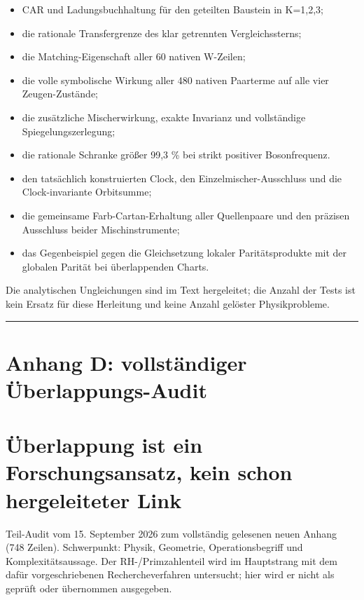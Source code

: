 \begin{itemize}
\tightlist
\item
  CAR und Ladungsbuchhaltung für den geteilten Baustein in K=1,2,3;
\item
  die rationale Transfergrenze des klar getrennten Vergleichssterns;
\item
  die Matching-Eigenschaft aller 60 nativen W-Zeilen;
\item
  die volle symbolische Wirkung aller 480 nativen Paarterme auf alle
  vier Zeugen-Zustände;
\item
  die zusätzliche Mischerwirkung, exakte Invarianz und vollständige
  Spiegelungszerlegung;
\item
  die rationale Schranke größer 99,3 \% bei strikt positiver
  Bosonfrequenz.
\item
  den tatsächlich konstruierten Clock, den Einzelmischer-Ausschluss und
  die Clock-invariante Orbitsumme;
\item
  die gemeinsame Farb-Cartan-Erhaltung aller Quellenpaare und den
  präzisen Ausschluss beider Mischinstrumente;
\item
  das Gegenbeispiel gegen die Gleichsetzung lokaler Paritätsprodukte mit
  der globalen Parität bei überlappenden Charts.
\end{itemize}

Die analytischen Ungleichungen sind im Text hergeleitet; die Anzahl der
Tests ist kein Ersatz für diese Herleitung und keine Anzahl gelöster
Physikprobleme.

\begin{center}\rule{0.5\linewidth}{0.5pt}\end{center}

\section{Anhang D: vollständiger
Überlappungs-Audit}\label{anhang-d-vollstuxe4ndiger-uxfcberlappungs-audit}

\section{Überlappung ist ein Forschungsansatz, kein schon hergeleiteter
Link}\label{uxfcberlappung-ist-ein-forschungsansatz-kein-schon-hergeleiteter-link}

Teil-Audit vom 15. September 2026 zum vollständig gelesenen neuen Anhang
(748 Zeilen). Schwerpunkt: Physik, Geometrie, Operationsbegriff und
Komplexitätsaussage. Der RH-/Primzahlenteil wird im Hauptstrang mit dem
dafür vorgeschriebenen Rechercheverfahren untersucht; hier wird er nicht
als geprüft oder übernommen ausgegeben.

